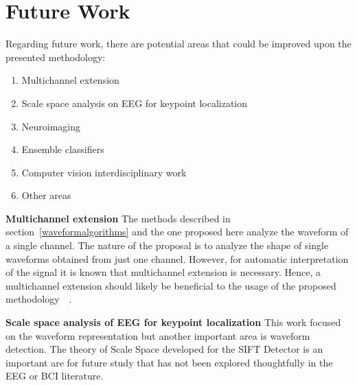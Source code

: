 
\vspace{7pt}

\section{Future Work}

Regarding future work, there are potential areas that could be improved upon the presented methodology:

\begin{enumerate}
\item Multichannel extension
\item Scale space analysis on EEG for keypoint localization
\item Neuroimaging
\item Ensemble classifiers
\item Computer vision interdisciplinary work
\item Other areas
\end{enumerate}

\textbf{Multichannel extension}
The methods described in section~\ref{waveformalgorithms} and the one proposed here analyze the waveform of a single channel.
The nature of the proposal is to analyze the shape of single waveforms obtained from just one channel.  %
However, for automatic interpretation of the signal it is known that multichannel extension is necessary.  Hence, a multichannel extension should likely be beneficial to the usage of the proposed methodology~~\cite{Gribonval2008}.

\textbf{Scale space analysis of EEG for keypoint localization}
This work focused on the waveform representation but another important area is waveform detection.  The theory of Scale Space developed for the SIFT Detector is an important are for future study that has not been explored thoughtfully in the EEG or BCI literature.


